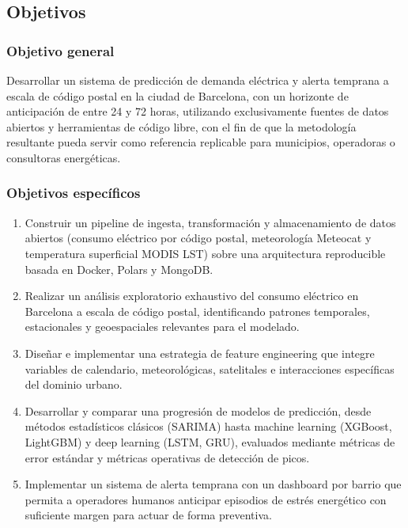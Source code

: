 \documentclass[12pt, a4paper]{article}
\begin{document}
\subsection{Objetivos}

\subsubsection{Objetivo general}

Desarrollar un sistema de predicción de demanda eléctrica y alerta temprana a escala de código postal en la ciudad de Barcelona, con un horizonte de anticipación de entre 24 y 72 horas, utilizando exclusivamente fuentes de datos abiertos y herramientas de código libre, con el fin de que la metodología resultante pueda servir como referencia replicable para municipios, operadoras o consultoras energéticas.

\subsubsection{Objetivos específicos}

\begin{enumerate}[label=\arabic*.]
    \item Construir un pipeline de ingesta, transformación y almacenamiento de datos abiertos (consumo eléctrico por código postal, meteorología Meteocat y temperatura superficial MODIS LST) sobre una arquitectura reproducible basada en Docker, Polars y MongoDB.
    \item Realizar un análisis exploratorio exhaustivo del consumo eléctrico en Barcelona a escala de código postal, identificando patrones temporales, estacionales y geoespaciales relevantes para el modelado.
    \item Diseñar e implementar una estrategia de feature engineering que integre variables de calendario, meteorológicas, satelitales e interacciones específicas del dominio urbano.
    \item Desarrollar y comparar una progresión de modelos de predicción, desde métodos estadísticos clásicos (SARIMA) hasta machine learning (XGBoost, LightGBM) y deep learning (LSTM, GRU), evaluados mediante métricas de error estándar y métricas operativas de detección de picos.
    \item Implementar un sistema de alerta temprana con un dashboard por barrio que permita a operadores humanos anticipar episodios de estrés energético con suficiente margen para actuar de forma preventiva.
\end{enumerate}
\end{document}
